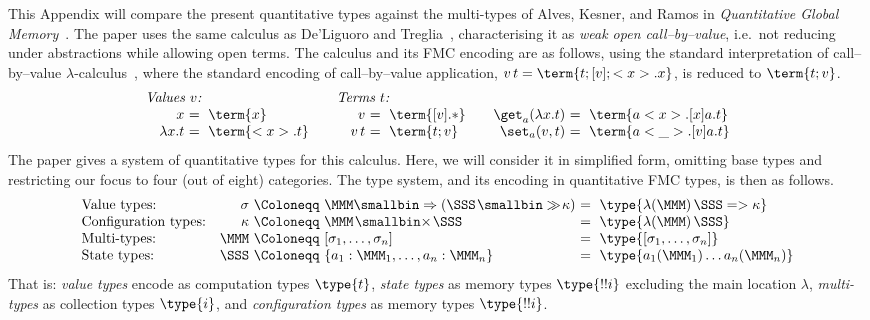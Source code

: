 \documentclass[a4paper,UKenglish,cleveref, autoref, thm-restate]{lipics-v2021}
\newcommand\tim{\kern1pt{\smallbin\times}\kern1pt}
\newcommand\then{\kern1pt{\smallbin\gg}\kern1pt}
\begin{document}
This Appendix will compare the present quantitative types against the multi-types of Alves, Kesner, and Ramos in \emph{Quantitative Global Memory}~\cite{Alves-Kesner-Ramos-2023}. The paper uses the same calculus as De'Liguoro and Treglia~\cite{deLiguoro-Treglia-2021}, characterising it as \emph{weak open call--by--value}, i.e.\ not reducing under abstractions while allowing open terms. The calculus and its FMC encoding are as follows, using the standard interpretation of call--by--value $\lambda$-calculus~\cite{Douence-Fradet-1998,Heijltjes-2022,Power-Thielecke-1999}, where the standard encoding of call--by--value application, $v\,t = \term{t ; [v] ; <x>.x}$, is reduced to $\term{t ; v}$.
\[
\begin{array}{@{}r@{}l@{\qquad}r@{}l@{\qquad}r@{}l@{}}
\multicolumn{2}{@{}l@{}}{\emph{Values $v$:}} & \multicolumn{2}{@{}l@{}}{\emph{Terms $t$:}} & 
\\                    x &~=~ \term{x}      &          v &~=~ \term{[v].*} & \get_a(\lambda x.t) &~=~ \term{a<x>.[x]a.t}
\\ \quad    \lambda x.t &~=~ \term{<x>.t}  & \quad v\,t &~=~ \term{t ; v} & \set_a(v,t)         &~=~ \term{a<\_>.[v]a.t}
\end{array}
\]
The paper gives a system of quantitative types for this calculus. Here, we will consider it in simplified form, omitting base types and restricting our focus to four (out of eight) categories. The type system, and its encoding in quantitative FMC types, is then as follows.
\[
\begin{array}{lr@{}l@{}l}
   \text{Value types:}         & \sigma &~\Coloneqq~ \MMM\smallbin\Rightarrow(\SSS\then\kappa) &~=~ \type{\lambda(\MMM)\,\SSS => \kappa}
\\ \text{Configuration types:} & \kappa &~\Coloneqq~ \MMM \tim \SSS                            &~=~ \type{\lambda(\MMM)\,\SSS}
\\ \text{Multi-types:}         & \MMM   &~\Coloneqq~ [\sigma_1,\dots,\sigma_n]                 &~=~ \type{[\sigma_1,\dots,\sigma_n]}
\\ \text{State types:}         & \SSS   &~\Coloneqq~ \{a_1:\MMM_1,\dots,a_n:\MMM_n\}           &~=~ \type{a_1(\MMM_1)\dots a_n(\MMM_n)}
\end{array}
\]
That is: \emph{value types} encode as computation types $\type{t}$, \emph{state types} as memory types $\type{!!i}$ excluding the main location $\lambda$, \emph{multi-types} as collection types $\type{i}$, and \emph{configuration types} as memory types $\type{!!i}$.
\end{document}
